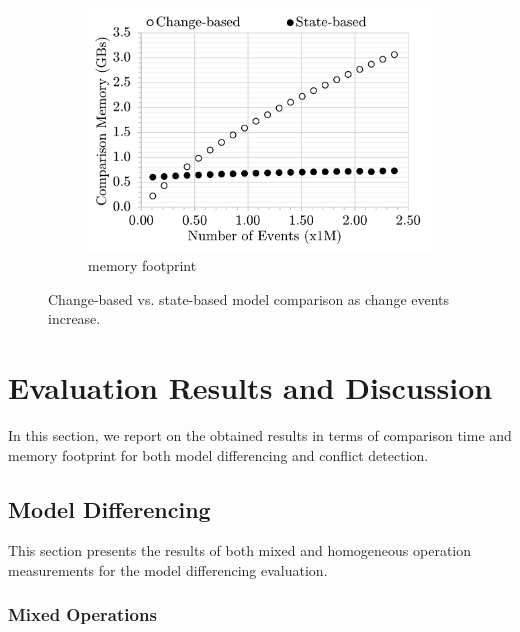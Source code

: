 \begin{figure}[ht]
\begin{subfigure}[]{0.33\linewidth}
        \includegraphics[width=\linewidth]{mixed-memory-events}
        \caption{memory footprint}
        \label{fig:memory_diffs}
    \end{subfigure}
    \caption{Change-based vs. state-based model comparison as change events increase.}
    \label{fig:change_vs_state}
\end{figure}

\vspace{-5pt}
\section{Evaluation Results and Discussion}
\label{sec:discussion}
In this section, we report on the obtained results in terms of comparison time and memory footprint for both model differencing and conflict detection. 


\subsection{Model Differencing}
\label{sec:differencing_results}
This section presents the results of both mixed and homogeneous operation measurements for the model differencing evaluation. 

\vspace{-5pt}
\subsubsection{Mixed Operations} \label{sec:mixed-operation}


